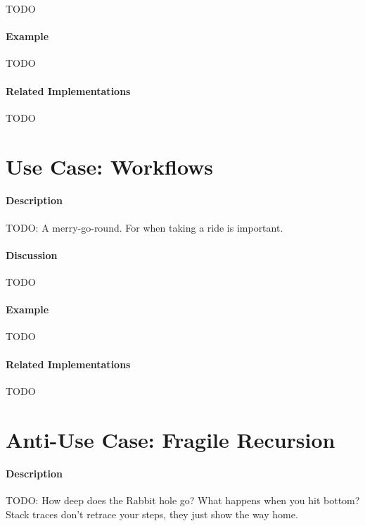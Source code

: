 {\Large TODO}

\paragraph{Example}

{\Large TODO}

\paragraph{Related Implementations}

{\Large TODO}

\section{Use Case: Workflows}

\paragraph{Description}

{\Large TODO:} A merry-go-round. For when taking a ride is important.

\paragraph{Discussion}

{\Large TODO}

\paragraph{Example}

{\Large TODO}

\paragraph{Related Implementations}

{\Large TODO}

\section{Anti-Use Case: Fragile Recursion}

\paragraph{Description}

{\Large TODO:} How deep does the Rabbit hole go? What happens when you hit bottom? Stack traces don't retrace your steps, they just show the way home.

